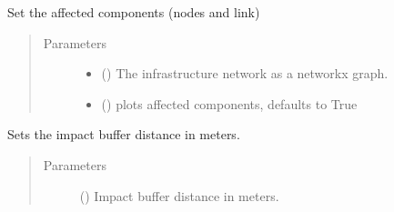 \documentclass[letterpaper,10pt,english]{sphinxmanual}
\begin{document}
\begin{fulllineitems}
\begin{fulllineitems}
\label{\detokenize{apidoc:dreaminsg_integrated_model.src.hazard_initiator.TrackDisruption.set_affected_components}}
\sphinxAtStartPar
Set the affected components (nodes and link)
\begin{quote}\begin{description}
\item[{Parameters}] \leavevmode\begin{itemize}
\item {} 
\sphinxAtStartPar
{} () \textendash{} The infrastructure network as a networkx graph.

\item {} 
\sphinxAtStartPar
{} (\sphinxstyleliteralemphasis{\sphinxupquote{, }}) \textendash{} plots affected components, defaults to True

\end{itemize}

\end{description}\end{quote}

\end{fulllineitems}


\begin{fulllineitems}
\label{\detokenize{apidoc:dreaminsg_integrated_model.src.hazard_initiator.TrackDisruption.set_buffer_of_impact}}
\sphinxAtStartPar
Sets the impact buffer distance in meters.
\begin{quote}\begin{description}
\item[{Parameters}] \leavevmode
\sphinxAtStartPar
{} () \textendash{} Impact buffer distance in meters.


\end{description}
\end{quote}
\end{fulllineitems}
\end{fulllineitems}
\end{document}

